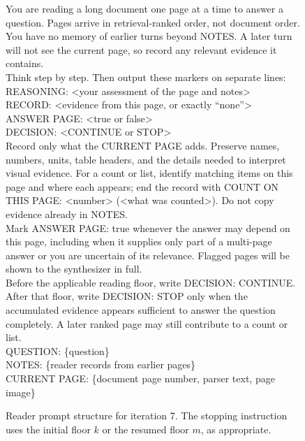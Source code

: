 \begin{figure}[t]
\centering
\begin{tcolorbox}[
  colback=gray!5,colframe=gray!50,boxrule=0.4pt,
  fontupper=\small\ttfamily,left=6pt,right=6pt
]
You are reading a long document one page at a time to answer a question.
Pages arrive in retrieval-ranked order, not document order. You have no
memory of earlier turns beyond NOTES. A later turn will not see the current
page, so record any relevant evidence it contains.\\[0.5em]

Think step by step. Then output these markers on separate lines:\\
REASONING: <your assessment of the page and notes>\\
RECORD: <evidence from this page, or exactly ``none''>\\
ANSWER PAGE: <true or false>\\
DECISION: <CONTINUE or STOP>\\[0.5em]

Record only what the CURRENT PAGE adds. Preserve names, numbers, units,
table headers, and the details needed to interpret visual evidence. For a
count or list, identify matching items on this page and where each appears;
end the record with COUNT ON THIS PAGE: <number> (<what was counted>).
Do not copy evidence already in NOTES.\\[0.5em]

Mark ANSWER PAGE: true whenever the answer may depend on this page,
including when it supplies only part of a multi-page answer or you are
uncertain of its relevance. Flagged pages will be shown to the synthesizer
in full.\\[0.5em]

Before the applicable reading floor, write DECISION: CONTINUE. After that
floor, write DECISION: STOP only when the accumulated evidence appears
sufficient to answer the question completely. A later ranked page may
still contribute to a count or list.\\[0.5em]

QUESTION: \{question\}\\
NOTES: \{reader records from earlier pages\}\\
CURRENT PAGE: \{document page number, parser text, page image\}
\end{tcolorbox}
\caption{Reader prompt structure for iteration 7. The stopping instruction uses the initial floor $k$ or the resumed floor $m$, as appropriate.}
\label{fig:app_reader_prompt}
\end{figure}
